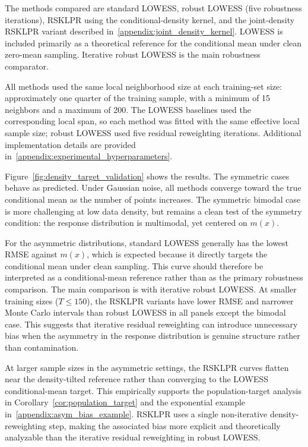 \documentclass[preprint,1p,times,authoryear]{elsarticle}
\begin{document}
The methods compared are standard LOWESS, robust LOWESS (five robustness iterations), RSKLPR using the conditional-density kernel, and the joint-density RSKLPR variant described in~\ref{appendix:joint_density_kernel}. LOWESS is included primarily as a theoretical reference for the conditional mean under clean zero-mean sampling. Iterative robust LOWESS is the main robustness comparator.

All methods used the same local neighborhood size at each training-set size: approximately one quarter of the training sample, with a minimum of 15 neighbors and a maximum of 200. The LOWESS baselines used the corresponding local span, so each method was fitted with the same effective local sample size; robust LOWESS used five residual reweighting iterations. Additional implementation details are provided in~\ref{appendix:experimental_hyperparameters}.

Figure~\ref{fig:density_target_validation} shows the results. The symmetric cases behave as predicted. Under Gaussian noise, all methods converge toward the true conditional mean as the number of points increases. The symmetric bimodal case is more challenging at low data density, but remains a clean test of the symmetry condition: the response distribution is multimodal, yet centered on $m(x)$.

For the asymmetric distributions, standard LOWESS generally has the lowest RMSE against $m(x)$, which is expected because it directly targets the conditional mean under clean sampling. This curve should therefore be interpreted as a conditional-mean reference rather than as the primary robustness comparison. The main comparison is with iterative robust LOWESS. At smaller training sizes (\(T\le150\)), the RSKLPR variants have lower RMSE and narrower Monte Carlo intervals than robust LOWESS in all panels except the bimodal case. This suggests that iterative residual reweighting can introduce unnecessary bias when the asymmetry in the response distribution is genuine structure rather than contamination.

At larger sample sizes in the asymmetric settings, the RSKLPR curves flatten near the density-tilted reference rather than converging to the LOWESS conditional-mean target. This empirically supports the population-target analysis in Corollary~\ref{cor:population_target} and the exponential example in~\ref{appendix:asym_bias_example}. RSKLPR uses a single non-iterative density-reweighting step, making the associated bias more explicit and theoretically analyzable than the iterative residual reweighting in robust LOWESS.
\end{document}
